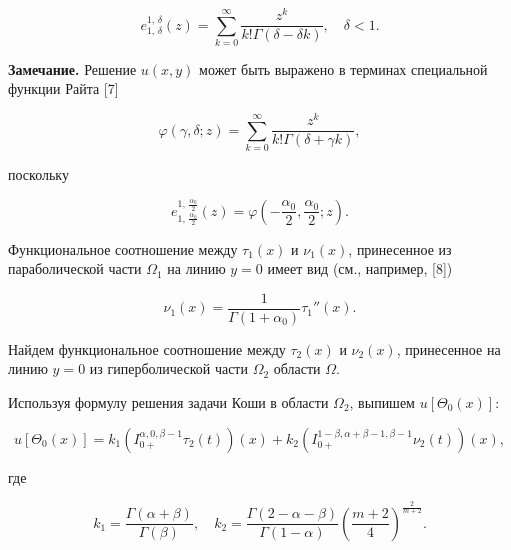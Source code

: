 \[

e^{1, \, \delta}_{1, \, \delta}(z)= \sum_{k=0}^{ \infty} \frac{z^{k}}{k!  \Gamma(\delta- \delta k)}, \quad \delta<1.

\]



{\bf Замечание.} Решение $u(x,y)$ может быть выражено в терминах специальной функции Райта [7]

\[

\varphi(\gamma, \delta; z)= \sum_{k=0}^{ \infty} \frac{z^{k}}{k!  \Gamma(\delta+ \gamma k)},

\]

поскольку

\[

e_{1, \, \frac{\alpha_{0}}{2}}^{1, \, \frac{\alpha_{0}}{2}}(z)= \varphi \left( -\frac{\alpha_{0}}{2}, \frac{\alpha_{0}}{2}; z \right).

\]



Функциональное соотношение между $\tau_{1}(x)$ и $\nu_{1}(x)$, принесенное из параболической части $\Omega_{1}$ на линию $y=0$ имеет вид (см., например, [8])

\begin{equation}

       \label{eq7}

\nu_{1}(x) = \frac{1}{ \Gamma(1+ \alpha_{0})} \tau_{1}''(x).

\end{equation}



Найдем функциональное соотношение между $\tau_{2}(x)$ и $\nu_{2}(x)$, принесенное на линию $y=0$ из гиперболической части $\Omega_{2}$ области $\Omega$.



Используя формулу решения задачи Коши в области $\Omega_{2}$, выпишем $u[\Theta_{0}(x)]$:

\[

u[ \Theta_{0}(x)] = k_{1} \left( I_{0+}^{\alpha,0, \beta-1} \tau _{2} (t)\right)(x) +

k_{2} \left(I_{0+}^{1- \beta, \alpha+\beta-1,  \beta -1} \nu_{2}(t) \right)(x),

\]

где

\[

k_{1}= \frac{ \Gamma( \alpha+ \beta)}{ \Gamma( \beta)}, \quad k_{2}= \frac{ \Gamma( 2-\alpha- \beta)}{ \Gamma( 1-\alpha)}  \left( \frac{m+2}{4} \right) ^{ \frac{2}{m+2}}.

\]



